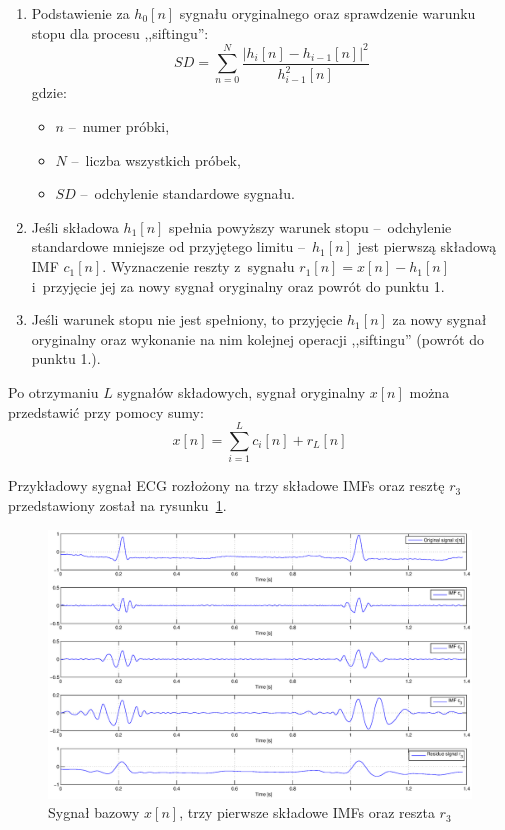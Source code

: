 \begin{enumerate}[1.]
\begin{figure}[!ht]
    \end{figure}
    \item Podstawienie za $h_0[n]$ sygnału oryginalnego oraz sprawdzenie warunku
    stopu dla procesu ,,siftingu'':
    \begin{equation}
        SD = \sum\limits_{n = 0}^{N} \frac{\left| h_i[n] - h_{i - 1}[n]
        \right|^2}{h_{i - 1} ^ 2[n]}
    \end{equation}
    gdzie:
    \begin{itemize}
        \item $n$ --~numer próbki,
        \item $N$ --~liczba wszystkich próbek,
        \item $SD$ --~odchylenie standardowe sygnału.
    \end{itemize}
    \item Jeśli składowa $h_1[n]$ spełnia powyższy warunek stopu --~odchylenie
    standardowe mniejsze od przyjętego limitu --~$h_1[n]$ jest pierwszą składową
    IMF $c_1[n]$. Wyznaczenie reszty z~sygnału $r_1[n] = x[n] - h_1[n]$
    i~przyjęcie jej za nowy sygnał oryginalny oraz powrót do punktu 1.
    \item Jeśli warunek stopu nie jest spełniony, to przyjęcie $h_1[n]$ za nowy
    sygnał oryginalny oraz wykonanie na nim kolejnej operacji ,,siftingu''
    (powrót do punktu 1.).
\end{enumerate}

Po otrzymaniu $L$ sygnałów składowych, sygnał oryginalny $x[n]$ można
przedstawić przy pomocy sumy:
\begin{equation}
    x[n] = \sum\limits_{i = 1}^L c_i[n] + r_L[n]
\end{equation}

\newpage

Przykładowy sygnał ECG rozłożony na trzy składowe IMFs oraz resztę $r_3$
przedstawiony został na rysunku~\ref{fig:sampleimfs}.
\begin{figure}[!ht]
    \centering
    \includegraphics[width=\textwidth]{../img/sampleimfs.eps}
    \caption{Sygnał bazowy $x[n]$, trzy pierwsze składowe IMFs oraz reszta
    $r_3$}
    \label{fig:sampleimfs}
\end{figure}
